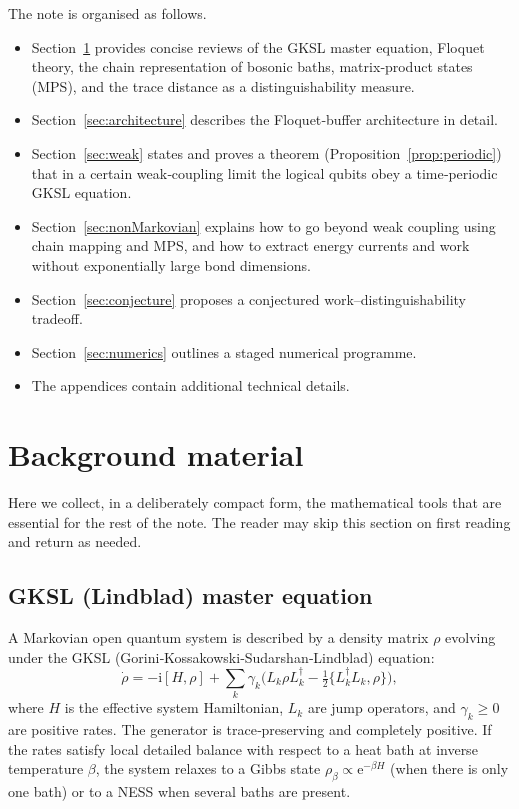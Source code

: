 \documentclass[11pt,a4paper]{article}
\theoremstyle{plain}
\theoremstyle{definition}
\theoremstyle{remark}
\newcommand{\ee}{\mathrm{e}}
\newcommand{\ii}{\mathrm{i}}
\begin{document}
The note is organised as follows.
\begin{itemize}
    \item Section~\ref{sec:background} provides concise reviews of the GKSL master equation, Floquet theory, the chain representation of bosonic baths, matrix‑product states (MPS), and the trace distance as a distinguishability measure.
    \item Section~\ref{sec:architecture} describes the Floquet‑buffer architecture in detail.
    \item Section~\ref{sec:weak} states and proves a theorem (Proposition~\ref{prop:periodic}) that in a certain weak‑coupling limit the logical qubits obey a time‑periodic GKSL equation.
    \item Section~\ref{sec:nonMarkovian} explains how to go beyond weak coupling using chain mapping and MPS, and how to extract energy currents and work without exponentially large bond dimensions.
    \item Section~\ref{sec:conjecture} proposes a conjectured work–distinguishability tradeoff.
    \item Section~\ref{sec:numerics} outlines a staged numerical programme.
    \item The appendices contain additional technical details.
\end{itemize}

\section{Background material}\label{sec:background}
Here we collect, in a deliberately compact form, the mathematical tools that are essential for the rest of the note. The reader may skip this section on first reading and return as needed.

\subsection{GKSL (Lindblad) master equation}\label{sec:GKSL}
A Markovian open quantum system is described by a density matrix $\rho$ evolving under the GKSL (Gorini‑Kossakowski‑Sudarshan‑Lindblad) equation:
\begin{equation}\label{eq:GKSL_general}
\dot\rho = -\ii[H,\rho] + \sum_k \gamma_k \Big( L_k \rho L_k^\dagger - \tfrac12 \{ L_k^\dagger L_k, \rho \} \Big),
\end{equation}
where $H$ is the effective system Hamiltonian, $L_k$ are jump operators, and $\gamma_k\ge0$ are positive rates. The generator is trace‑preserving and completely positive. If the rates satisfy local detailed balance with respect to a heat bath at inverse temperature $\beta$, the system relaxes to a Gibbs state $\rho_\beta\propto\ee^{-\beta H}$ (when there is only one bath) or to a NESS when several baths are present.
\end{document}
